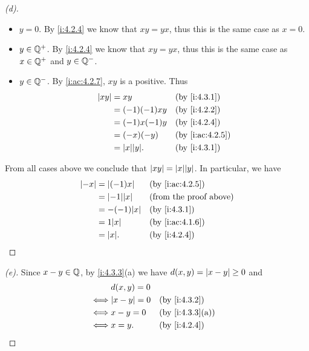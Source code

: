 \begin{proof}[(d)]
\begin{itemize}
\begin{itemize}
            \item \(y = 0\).
                  By \cref{i:4.2.4} we know that \(xy = yx\), thus this is the same case as \(x = 0\).
            \item \(y \in \mathbb{Q}^+\).
                  By \cref{i:4.2.4} we know that \(xy = yx\), thus this is the same case as \(x \in \mathbb{Q}^+\) and \(y \in \mathbb{Q}^-\).
            \item \(y \in \mathbb{Q}^-\).
                  By \cref{i:ac:4.2.7}, \(xy\) is a positive.
                  Thus
                  \begin{align*}
                    \abs{xy} & = xy               &  & \by{i:4.3.1}    \\
                             & = (-1)(-1)xy       &  & \by{i:4.2.2}    \\
                             & = (-1)x(-1)y       &  & \by{i:4.2.4}    \\
                             & = (-x)(-y)         &  & \by{i:ac:4.2.5} \\
                             & = \abs{x} \abs{y}. &  & \by{i:4.3.1}
                  \end{align*}
          \end{itemize}
  \end{itemize}
  From all cases above we conclude that \(\abs{xy} = \abs{x} \abs{y}\).
  In particular, we have
  \begin{align*}
    \abs{-x} & = \abs{(-1)x}      &  & \by{i:ac:4.2.5}               \\
             & = \abs{-1} \abs{x} &  & \text{(from the proof above)} \\
             & = -(-1) \abs{x}    &  & \by{i:4.3.1}                  \\
             & = 1 \abs{x}        &  & \by{i:ac:4.1.6}               \\
             & = \abs{x}.         &  & \by{i:4.2.4}
  \end{align*}
\end{proof}

\begin{proof}[(e)]
  Since \(x - y \in \mathbb{Q}\), by \cref{i:4.3.3}(a) we have \(d(x, y) = \left\lvert x - y\right\rvert \geq 0\) and
  \begin{align*}
         & d(x, y) = 0                          \\
    \iff & \abs{x - y} = 0 &  & \by{i:4.3.2}    \\
    \iff & x - y = 0       &  & \by{i:4.3.3}[a] \\
    \iff & x = y.          &  & \by{i:4.2.4}
  \end{align*}
\end{proof}

